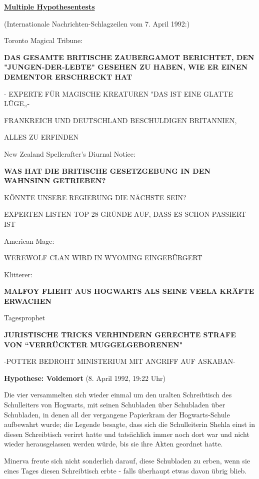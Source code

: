 

\hypertarget{multiple-hypothesentests}{%

\textbf{\uline{Multiple Hypothesentests}}

(Internationale Nachrichten-Schlagzeilen vom 7. April 1992:)

Toronto Magical Tribune:

\textbf{DAS GESAMTE BRITISCHE ZAUBERGAMOT BERICHTET, DEN "JUNGEN-DER-LEBTE" GESEHEN ZU HABEN, WIE ER EINEN DEMENTOR ERSCHRECKT HAT}

- EXPERTE FÜR MAGISCHE KREATUREN "DAS IST EINE GLATTE LÜGE„-

FRANKREICH UND DEUTSCHLAND BESCHULDIGEN BRITANNIEN,

ALLES ZU ERFINDEN

New Zealand Spellcrafter's Diurnal Notice:

\textbf{WAS HAT DIE BRITISCHE GESETZGEBUNG IN DEN WAHNSINN GETRIEBEN?}

KÖNNTE UNSERE REGIERUNG DIE NÄCHSTE SEIN?

EXPERTEN LISTEN TOP 28 GRÜNDE AUF, DASS ES SCHON PASSIERT IST

American Mage:

WEREWOLF CLAN WIRD IN WYOMING EINGEBÜRGERT

Klitterer:

\textbf{MALFOY FLIEHT AUS HOGWARTS ALS SEINE VEELA KRÄFTE ERWACHEN}

Tagesprophet

\textbf{JURISTISCHE TRICKS VERHINDERN GERECHTE STRAFE VON “VERRÜCKTER MUGGELGEBORENEN"}

-POTTER BEDROHT MINISTERIUM MIT ANGRIFF AUF ASKABAN-

\textbf{Hypothese: Voldemort} (8. April 1992, 19:22 Uhr)

Die vier versammelten sich wieder einmal um den uralten Schreibtisch des Schulleiters von Hogwarts, mit seinen Schubladen über Schubladen über Schubladen, in denen all der vergangene Papierkram der Hogwarts-Schule aufbewahrt wurde; die Legende besagte, dass sich die Schulleiterin Shehla einst in diesen Schreibtisch verirrt hatte und tatsächlich immer noch dort war und nicht wieder herausgelassen werden würde, bis sie ihre Akten geordnet hatte.

Minerva freute sich nicht sonderlich darauf, diese Schubladen zu erben, wenn sie eines Tages diesen Schreibtisch erbte - falls überhaupt etwas davon übrig blieb.

}
